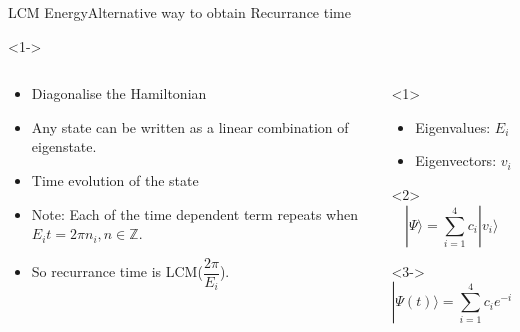 \documentclass[pdf]{beamer}
\begin{document}
            \begin{frame}{LCM Energy}{Alternative way to obtain Recurrance time}
                \begin{onlyenv}<1->
                \begin{columns}
                    \begin{column}[]{0.5\textwidth}
                        \begin{itemize}
                            \item<1-> Diagonalise the Hamiltonian
                            \item<2-> Any state can be written as a linear combination of eigenstate.
                            \item<3-> Time evolution of the state
                            \item<4->Note: Each of the time dependent term repeats when $E_i t =2\pi n_i,n\in\mathbb{Z}$. \\
                            \item<5->So recurrance time is LCM($\dfrac{2\pi}{E_i}$).
                        \end{itemize}
                        
                    \end{column}
                    \begin{column}[]{0.5\textwidth}
                        \begin{onlyenv}<1>
                            \begin{itemize}
                                \item<1> Eigenvalues: $E_i$
                                \item<1> Eigenvectors: $v_i$
                            \end{itemize}
                        \end{onlyenv}
                        \begin{onlyenv}<2>
                            \begin{equation*}
                                |\Psi\rangle = \sum_{i=1}^{4} c_i |v_i\rangle
                            \end{equation*}
                        \end{onlyenv}
                        \begin{onlyenv}<3->
                            \begin{equation*}
                                |\Psi(t)\rangle = \sum_{i=1}^{4} c_i e^{-iE_i t} |v_i\rangle
                            \end{equation*}
                        \end{onlyenv}
                    \end{column}
                \end{columns}
                \end{onlyenv}
            \end{frame}
\end{document}
